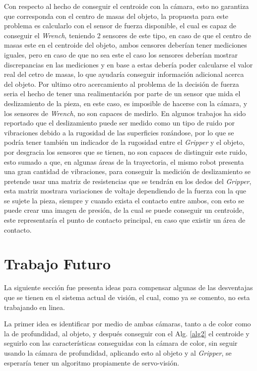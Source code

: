 Con respecto al hecho de conseguir el centroide con la cámara, esto no garantiza que corresponda con el centro de masas del objeto, la propuesta para este problema es calcularlo con el sensor de fuerza disponible, el cual es capaz de conseguir el \textit{Wrench}, teniendo 2 sensores de este tipo, en caso de que el centro de masas este en el centroide del objeto, ambos censores deberían tener mediciones iguales, pero en caso de que no sea este el caso los sensores deberían mostrar discrepancias en las mediciones y en base a estas debería poder calcularse el valor real del cetro de masas, lo que ayudaría conseguir información adicional acerca del objeto.
Por ultimo otro acercamiento al problema de la decisión de fuerza seria el hecho de tener una realimentación por parte de un sensor que mida el deslizamiento de la pieza, en este caso, es imposible de hacerse con la cámara, y los sensores de \textit{Wrench}, no son capaces de medirlo. En algunos trabajos ha sido reportado que el deslizamiento puede ser medido como un tipo de ruido por vibraciones debido a la rugosidad de las superficies rozándose, por lo que se podría tener también un indicador de la rugosidad entre el \textit{Gripper} y el objeto, por desgracia los sensores que se tienen, no son capaces de distinguir este ruido, esto sumado a que, en algunas áreas de la trayectoria, el mismo robot presenta una gran cantidad de vibraciones, para conseguir la medición de deslizamiento se pretende usar una matriz de resistencias que se tendrán en los dedos del \textit{Gripper}, esta matriz mostrara variaciones de voltaje dependiendo de la fuerza con la que se sujete la pieza, siempre y cuando exista el contacto entre ambos, con esto se puede crear una imagen de presión, de la cual se puede conseguir un centroide, este representaría el punto de contacto principal, en caso que existir un área de contacto. 

\section{Trabajo Futuro}

La siguiente sección fue presenta ideas para compensar algunas de las desventajas que se tienen en el sistema actual de visión, el cual, como ya se comento, no esta trabajando en linea.



La primer idea es identificar por medio de ambas cámaras, tanto a de color como la de profundidad, al objeto, y después conseguir con el Alg. \ref{alg2} el centroide y seguirlo con las características conseguidas con la cámara de color, sin seguir usando la cámara de profundidad, aplicando esto al objeto y al \textit{Gripper}, se esperaría tener un algoritmo propiamente de servo-visión.

